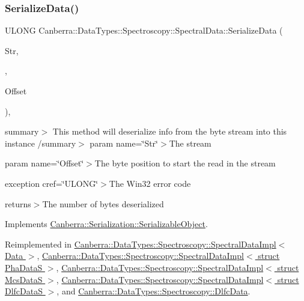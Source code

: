 \subsubsection{\texorpdfstring{Serialize\+Data()}{SerializeData()}}
{\footnotesize\ttfamily U\+L\+O\+NG Canberra\+::\+Data\+Types\+::\+Spectroscopy\+::\+Spectral\+Data\+::\+Serialize\+Data (\begin{DoxyParamCaption}\item[{\hyperlink{class_canberra_1_1_utility_1_1_core_1_1_byte_stream}{Canberra\+::\+Utility\+::\+Core\+::\+Byte\+Stream} \&}]{Str,  }\item[{const \hyperlink{class_canberra_1_1_serialization_1_1_meta_data}{Canberra\+::\+Serialization\+::\+Meta\+Data} \&}]{,  }\item[{const L\+O\+NG}]{Offset }\end{DoxyParamCaption})\hspace{0.3cm}{\ttfamily [protected]}, {\ttfamily [virtual]}}

summary$>$ This method will deserialize info from the byte stream into this instance /summary$>$ param name=\char`\"{}\+Str\char`\"{}$>$The stream

param name=\char`\"{}\+Offset\char`\"{}$>$The byte position to start the read in the stream

exception cref=\char`\"{}\+U\+L\+O\+N\+G\char`\"{}$>$The Win32 error code

returns$>$The number of bytes deserialized

Implements \hyperlink{class_canberra_1_1_serialization_1_1_serializable_object}{Canberra\+::\+Serialization\+::\+Serializable\+Object}.



Reimplemented in \hyperlink{class_canberra_1_1_data_types_1_1_spectroscopy_1_1_spectral_data_impl_a4d4c4af29ad5f4fc977068478cdc8aeb_a4d4c4af29ad5f4fc977068478cdc8aeb}{Canberra\+::\+Data\+Types\+::\+Spectroscopy\+::\+Spectral\+Data\+Impl$<$ Data $>$}, \hyperlink{class_canberra_1_1_data_types_1_1_spectroscopy_1_1_spectral_data_impl_a4d4c4af29ad5f4fc977068478cdc8aeb_a4d4c4af29ad5f4fc977068478cdc8aeb}{Canberra\+::\+Data\+Types\+::\+Spectroscopy\+::\+Spectral\+Data\+Impl$<$ struct Pha\+Data\+S $>$}, \hyperlink{class_canberra_1_1_data_types_1_1_spectroscopy_1_1_spectral_data_impl_a4d4c4af29ad5f4fc977068478cdc8aeb_a4d4c4af29ad5f4fc977068478cdc8aeb}{Canberra\+::\+Data\+Types\+::\+Spectroscopy\+::\+Spectral\+Data\+Impl$<$ struct Mcs\+Data\+S $>$}, \hyperlink{class_canberra_1_1_data_types_1_1_spectroscopy_1_1_spectral_data_impl_a4d4c4af29ad5f4fc977068478cdc8aeb_a4d4c4af29ad5f4fc977068478cdc8aeb}{Canberra\+::\+Data\+Types\+::\+Spectroscopy\+::\+Spectral\+Data\+Impl$<$ struct Dlfc\+Data\+S $>$}, and \hyperlink{class_canberra_1_1_data_types_1_1_spectroscopy_1_1_dlfc_data_aacc250b1d3e769eddddad762028110de_aacc250b1d3e769eddddad762028110de}{Canberra\+::\+Data\+Types\+::\+Spectroscopy\+::\+Dlfc\+Data}.



